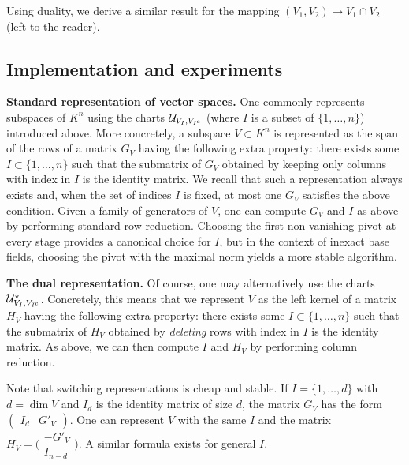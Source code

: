 \documentclass{sig-alternate-2013}
\renewcommand{\c}{\text{\rm c}}
\begin{document}
Using duality, we derive a similar result for the mapping 
$(V_1, V_2) \mapsto V_1 \cap V_2$ (left to the reader).

\subsection{Implementation and experiments}
\label{grassimpl}

\smallskip

\noindent
{\bf Standard representation of vector spaces.}  %
One commonly represents subspaces of $K^n$  
using the charts $\mathcal U_{V_I, V_{I^\c}}$ (where $I$ is a subset 
of $\{1, \ldots, n\}$) introduced above. More concretely,
a subspace $V \subset K^n$ is represented as the span of the rows
of a matrix $G_V$ having the following extra property: there 
exists some $I \subset \{1, \ldots, n\}$ such that the submatrix of 
$G_V$ obtained by keeping only columns with index in $I$ is the identity 
matrix. We recall that such a representation always exists and, when 
the set of indices $I$ is fixed, at most one $G_V$ satisfies the above condition.
Given a family of generators of $V$, one can compute $G_V$ and $I$ as 
above by performing standard row reduction.  Choosing the first non-vanishing
pivot at every stage provides a canonical choice for $I$, but in the context of
inexact base fields, choosing the pivot with the maximal norm yields
a more stable algorithm.

\smallskip

\noindent
{\bf The dual representation.}
Of course, one may alternatively use the charts $\mathcal U^\star_{V_I, 
V_{I^\c}}$. Concretely, this means that we represent $V$ as the left 
kernel of a matrix $H_V$ having the following extra property: there 
exists some $I \subset \{1, \ldots, n\}$ such that the submatrix of 
$H_V$ obtained by \emph{deleting} rows with index in $I$ is the identity 
matrix. As above, we can then compute $I$ and $H_V$ by performing 
column reduction.

Note that switching representations is cheap and stable.
If $I = \{1, \ldots, d\}$ with $d = \dim V$ and $I_d$ 
is the identity matrix of size $d$, the matrix $G_V$ has the form
$(\begin{matrix} I_d & G'_V \end{matrix})$.
One can represent $V$ with the same $I$ and the matrix
$H_V = \Big(\begin{matrix} -G'_V \\ I_{n-d} \end{matrix}\Big)$.
A similar formula exists for general $I$.
\end{document}
